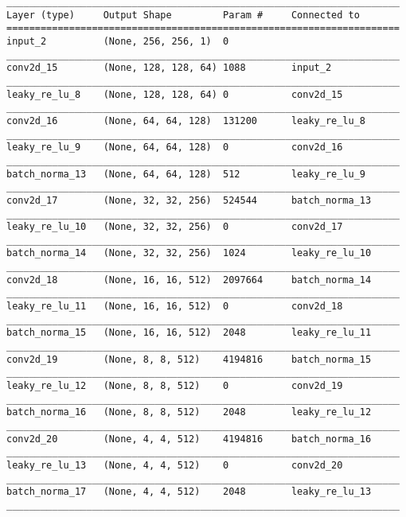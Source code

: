 \begin{verbatim}
_____________________________________________________________________
Layer (type)     Output Shape         Param #     Connected to
=====================================================================
input_2          (None, 256, 256, 1)  0
_____________________________________________________________________
conv2d_15        (None, 128, 128, 64) 1088        input_2
_____________________________________________________________________
leaky_re_lu_8    (None, 128, 128, 64) 0           conv2d_15
_____________________________________________________________________
conv2d_16        (None, 64, 64, 128)  131200      leaky_re_lu_8
_____________________________________________________________________
leaky_re_lu_9    (None, 64, 64, 128)  0           conv2d_16
_____________________________________________________________________
batch_norma_13   (None, 64, 64, 128)  512         leaky_re_lu_9
_____________________________________________________________________
conv2d_17        (None, 32, 32, 256)  524544      batch_norma_13
_____________________________________________________________________
leaky_re_lu_10   (None, 32, 32, 256)  0           conv2d_17
_____________________________________________________________________
batch_norma_14   (None, 32, 32, 256)  1024        leaky_re_lu_10
_____________________________________________________________________
conv2d_18        (None, 16, 16, 512)  2097664     batch_norma_14
_____________________________________________________________________
leaky_re_lu_11   (None, 16, 16, 512)  0           conv2d_18
_____________________________________________________________________
batch_norma_15   (None, 16, 16, 512)  2048        leaky_re_lu_11
_____________________________________________________________________
conv2d_19        (None, 8, 8, 512)    4194816     batch_norma_15
_____________________________________________________________________
leaky_re_lu_12   (None, 8, 8, 512)    0           conv2d_19
_____________________________________________________________________
batch_norma_16   (None, 8, 8, 512)    2048        leaky_re_lu_12
_____________________________________________________________________
conv2d_20        (None, 4, 4, 512)    4194816     batch_norma_16
_____________________________________________________________________
leaky_re_lu_13   (None, 4, 4, 512)    0           conv2d_20
_____________________________________________________________________
batch_norma_17   (None, 4, 4, 512)    2048        leaky_re_lu_13
_____________________________________________________________________

\end{verbatim}
